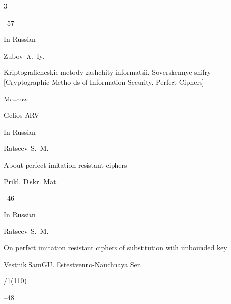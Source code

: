 \begin{thebibliography}{3}



--57






\lang In Russian

\by Zubov~A.~Iy.

\book Kriptograficheskie metody zashchity informatsii. Sovershennye shifry \rm [Cryptographic Metho ds of Information Security. Perfect Ciphers]

\publaddr Moscow

\publ Gelios ARV






\lang In Russian

\by Ratseev~S.~M.

\paper About perfect imitation resistant ciphers

\jour Prikl. Diskr. Mat.



--46






\lang In Russian

\by Ratseev~S.~M.

\paper On perfect imitation resistant ciphers of substitution with unbounded key

\jour Vestnik SamGU. Estestvenno-Nauchnaya Ser.


/1(110)

--48







\end{thebibliography}







\EngDate	



\renewcommand{\baselinestretch}{0.9}



\newpage

\Russian



%

